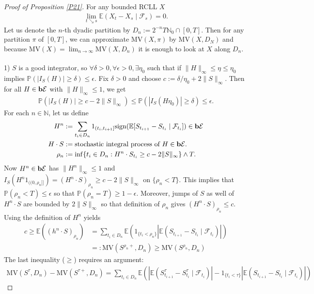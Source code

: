 \documentclass[12pt,a4paper, twoside]{article}
\theoremstyle{definition}
\newcommand{\EE}{\mathbb{E}} %
\newcommand{\PP}{\mathbb{P}} %
\newcommand{\simple}{\textbf{\text{b}}\mathcal{E}}
\newcommand{\sign}{\text{sign}}
\newcommand{\MV}{\text{MV}}
\begin{document}
\begin{proof}[Proof of Proposition \ref{P21}] For any bounded RCLL $X$ 
\begin{align*}
\lim_{t \searrow s} \EE(X_t-X_s \mid \mathcal{F}_s)=0.
\end{align*}
Let us denote the $n$-th dyadic partition by $D_n:= 2^{-n} T \mathbb{N}_0 \cap [0,T]$. Then for any partition $\pi$ of $[0,T]$, we can approximate $\MV(X, \pi)$ by $\MV(X, D_N)$ and because $\MV(X) = \lim_{n \to \infty} \MV(X, D_n)$ it is enough to look at $X$ along $D_n$. 
\\
\\
1) $S$ is a good integrator, so $\forall \delta >0, \forall \epsilon>0, \exists \eta_0$ such that if $\|H\|_\infty \leq \eta \leq \eta_0$ implies $\PP(|I_S(H)| \geq \delta) \leq \epsilon$. Fix $\delta >0$ and choose $c:= \delta/ \eta_0 + 2 \|S\|_\infty$. Then for all $H \in \simple$ with $\|H\|_\infty \leq 1$, we get 
\begin{align*}
\PP(|I_S(H)| \geq c- 2 \|S\|_\infty) \leq \PP(|I_S(H \eta_0)| \geq \delta) \leq \epsilon. 
\end{align*}
\newpage
For each $n \in \mathbb{N}$, let us define
\begin{align*}
H^n &:= \sum_{t_i \in D_n} 1_{(t_i, t_{i+1}]} \sign( \EE[S_{t_{i+1}}-S_{t_i} \mid \mathcal{F}_{t_i}]) \in \simple \\
H \cdot S &:= \text{stochastic integral process of } H \in \simple. \\
\rho_n&:= \inf\{ t_i \in D_n : H^n \cdot S_{t_i} \geq c -2\|S\|_\infty \} \wedge T.
\end{align*}
Now $H^n \in \simple$ has $\|H^n\|_\infty \leq 1$ and $I_S(H^n 1_{(\!(0, \rho_n]\!]}) = (H^n \cdot S)_{\rho_n} \geq c-2\|S\|_\infty$ on $\{ \rho_n < T\}$. This implies that $\PP( \rho_n < T) \leq \epsilon$ so that $\PP( \rho_n = T) \geq 1- \epsilon$. Moreover, jumps of $S$ as well of $H^n \cdot S$ are bounded by $2 \|S\|_\infty$ so that definition of $\rho_n$ gives $(H^n \cdot S)_{\rho_n} \leq c$. Using the definition of $H^n$ yields 
\begin{align*}
c \geq \mathbb{E}((h^n \cdot S)_{\rho_n}) &= \sum_{t_i \in D_n} \EE (1_{\{t_i < \rho_n\}} | \EE(S_{t_{i+1}}-S_{t_i} \mid \mathcal{F}_{t_i}) | ) \tag{*} \\
&=: \MV ( S^{\rho_n+}, D_n) \geq \MV(S^{\rho_n}, D_n)
\end{align*}
The last inequality ($\geq$) requires an argument: 
\begin{align*}
\MV(S^\tau, D_n)- \MV(S^{\tau+}, D_n)= \sum_{t_i \in D_n} \mathbb{E}( | \EE( S_{t_{i+1}}^\tau- S_{t_i}^\tau \mid \mathcal{F}_{t_i}) | - 1_{\{t_i < \tau\}} | \EE(S_{t_{i+1}}- S_{t_i} \mid \mathcal{F}_{t_i}) |) 

\end{align*}
\end{proof}
\end{document}
